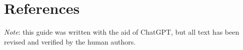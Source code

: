 \documentclass[12pt]{article}
\begin{document}

\section*{References}
\textit{Note}: this guide was written with the aid of ChatGPT, but all text has been revised and verified by the human authors.\\



\end{document}
